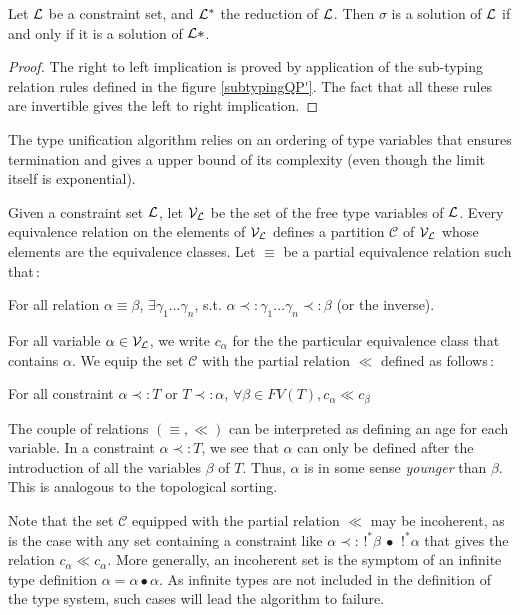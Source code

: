 \begin{lemma} \label{reductionQP'}
	Let $\mathcal{L}$ be a constraint set, and $\mathcal{L}^*$ the reduction of $\mathcal{L}$. Then $\sigma$ is a solution of $\mathcal{L}$ if and only if it is
	a solution of $\mathcal{L}*$.
	
	\begin{proof}
		The right to left implication is proved by application of the sub-typing relation rules defined in the figure \ref{subtypingQP'}.
		The fact that all these rules are invertible gives the left to right implication.
	\end{proof}
\end{lemma}

The type unification algorithm relies on an ordering of type variables that ensures termination and gives a upper
bound of its complexity (even though the limit itself is exponential).

\begin{defn} Given a constraint set $\mathcal{L}$, let $\mathcal{V}_{\mathcal{L}}$ be the set of the free type variables of $\mathcal{L}$. Every equivalence relation
	on the elements of $\mathcal{V}_{\mathcal{L}}$ defines a partition $\mathcal{C}$ of $\mathcal{V}_{\mathcal{L}}$ whose elements are the equivalence classes.
	Let $\equiv$ be a partial equivalence relation such that\,:
		\begin{center}
			For all relation $\alpha \equiv \beta$, $\exists \gamma_1 \dots \gamma_n$, s.t. $\alpha \prec: \gamma_1 \dots
				\gamma_n \prec: \beta$ (or the inverse).
		\end{center}
	For all variable $\alpha \in \mathcal{V}_{\mathcal{L}}$, we write $c_\alpha$ for the the particular equivalence class that contains $\alpha$.
	We equip the set $\mathcal{C}$ with the partial relation $\ll$ defined as follows\,:
  	\begin{center}
  	  For all constraint $\alpha \prec: T$ or $T \prec: \alpha$, $\forall \beta \in FV(T), c_\alpha \ll c_\beta$
  	\end{center}
\end{defn}

The couple of relations $(\equiv, \ll)$ can be interpreted as defining an age for each variable. In a constraint $\alpha \prec: T$,
we see that $\alpha$ can only be defined after the introduction of all the variables $\beta$ of $T$. Thus, $\alpha$ is in some sense
\emph{younger} than $\beta$. This is analogous to the topological sorting.

Note that the set $\mathcal{C}$ equipped with the partial relation $\ll$ may be incoherent, as is the case with any set containing
a constraint like $\alpha \prec: \,!^*\beta ~\bullet~ \,!^*\alpha$ that gives the relation $c_\alpha \ll c_\alpha$. More generally,
an incoherent set is the symptom of an infinite type definition $\alpha = \alpha \bullet \alpha$. As infinite types are not included
in the definition of the type system, such cases will lead the algorithm to failure.
  
